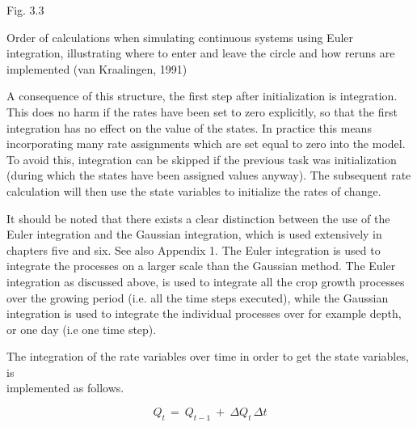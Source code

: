 \documentclass[11pt]{article}
\newcommand{\FigDir}{.}
\begin{document}
\begin{figure}[htbp]
 \begin{center}\epsfig{file=\FigDir/FSE2.eps,width=13.99cm} \end{center}
\end{figure}

\bigskip
\bigskip
\bigskip
\bigskip
\bigskip
\bigskip
\bigskip
\bigskip
\bigskip
\bigskip
\bigskip
\bigskip
\bigskip
\bigskip
\bigskip
\bigskip
\bigskip
\bigskip
\bigskip
\bigskip
Fig. 3.3 
\testlastline

\begin{indenting}{2.54cm}
Order of cal\-cu\-la\-tions when simulating continuous systems using Euler
integra\-tion, illustrating where to enter and leave the circle and how reruns
are implemented (van Kraalingen, 1991)
\end{indenting}

\bigskip
\bigskip
A consequence of this structure, the first step after initialization is integration. This does
no harm if the rates have been set to zero explicitly, so that the first integration has no
effect on the value of the states. In practice this means incorporat\-ing many rate assign\-ments which are set equal to zero into the model. To avoid this, integration can be
skipped if the previous task was initialization (during which the states have been assigned
values anyway). The subsequent rate calculation will then use the state variables to
initialize the rates of change.

\bigskip
\bigskip
\bigskip
\bigskip
\bigskip
It should be noted that there exists a clear distinction between the use of the Euler
integration and the Gaussian integration, which is used extensively in chapters five and
six. See also Appendix 1. The Euler integration is used to integrate the process\-es on a
larger scale than the Gaussian method. The Euler integration as discussed above, is used
to integrate all the crop growth processes over the growing period (i.e. all the time steps
executed), while the Gaussian integration is used to integrate the individual processes over
for example depth, or one day (i.e one time step). 

The integration of the rate variables over time in order to get the state variables, is \\
implemented as follows.


\begin{displaymath}
Q _{t~} =~Q _{t-1} ~+~\Delta Q _{t} \,\Delta t
\end{displaymath}
\end{document}
